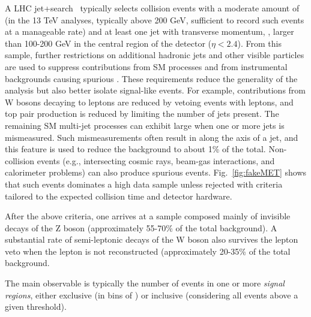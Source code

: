 A LHC jet+\MET search~\cite{Aaboud:2017phn,Sirunyan:2017jix} typically selects collision events with a moderate amount of \MET (in the 13 TeV analyses, typically above 200 GeV, sufficient to record such events at a manageable rate) and at least one jet with transverse momentum, \pt, larger than 100-200 GeV in the central region of the detector ($\eta<2.4$). 
From this sample, further restrictions on additional hadronic jets and other visible particles are used to suppress contributions from SM processes and from instrumental backgrounds causing spurious \MET.
These requirements reduce the generality of the analysis but also better isolate signal-like events.
For example, contributions from W bosons decaying to leptons are reduced by vetoing events with leptons, and top pair production is reduced by limiting the number of jets present.
The remaining SM multi-jet processes can exhibit large \MET when one or more jets is mismeasured.
Such mismeasurements often result in \MET along the axis of a jet, and this feature is used to reduce the background to about 1\% of the total.
Non-collision events (e.g., intersecting cosmic rays, beam-gas interactions, and calorimeter problems) can also produce spurious \MET events.
Fig.~\ref{fig:fakeMET} shows that such events dominates a high \MET data sample unless rejected with criteria tailored to the expected collision time and detector hardware.%

After the above criteria, one arrives at a sample composed mainly of invisible decays of the Z boson (approximately 55-70\% of the total background).
A substantial rate of semi-leptonic decays of the W boson also survives the lepton veto when the lepton is not reconstructed (approximately 20-35\% of the total background.

The main observable is typically the number of events in one or more \MET \textit{signal regions}, either exclusive (in bins of \MET) or inclusive (considering all events above a given \MET threshold). 


